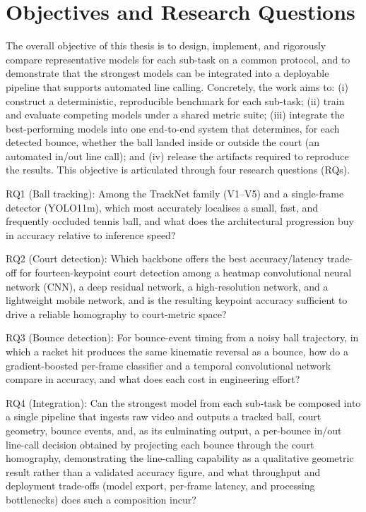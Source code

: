 \section{Objectives and Research Questions}
\label{sec:intro-objectives}

The overall objective of this thesis is to design, implement, and rigorously
compare representative models for each sub-task on a common protocol, and to
demonstrate that the strongest models can be integrated into a deployable
pipeline that supports automated line calling. Concretely, the work aims to:
(i) construct a deterministic, reproducible benchmark for each sub-task;
(ii) train and evaluate competing models under a shared metric suite;
(iii) integrate the best-performing models into one end-to-end system that
determines, for each detected bounce, whether the ball landed inside or outside
the court (an automated in/out line call); and (iv) release the artifacts
required to reproduce the results. This objective is articulated through four
research questions (RQs).

RQ1 (Ball tracking): Among the TrackNet family (V1--V5) and a
  single-frame detector (YOLO11m), which most accurately localises a
  small, fast, and frequently occluded tennis ball, and what does the
  architectural progression buy in accuracy relative to inference speed?

RQ2 (Court detection): Which backbone offers the best accuracy/latency
  trade-off for fourteen-keypoint court detection among a heatmap
  convolutional neural network (CNN), a deep residual network, a
  high-resolution network, and a lightweight mobile network, and is the
  resulting keypoint accuracy sufficient to drive a reliable homography to
  court-metric space?

RQ3 (Bounce detection): For bounce-event timing from a noisy ball
  trajectory, in which a racket hit produces the same kinematic reversal as a
  bounce, how do a gradient-boosted per-frame classifier and a temporal
  convolutional network compare in accuracy, and what does each cost in
  engineering effort?

RQ4 (Integration): Can the strongest model from each sub-task be
  composed into a single pipeline that ingests raw video and outputs a
  tracked ball, court geometry, bounce events, and, as its culminating
  output, a per-bounce in/out line-call decision obtained by projecting each
  bounce through the court homography, demonstrating the line-calling
  capability as a qualitative geometric result rather than a validated
  accuracy figure, and what throughput and deployment trade-offs (model
  export, per-frame latency, and processing bottlenecks) does such a
  composition incur?


